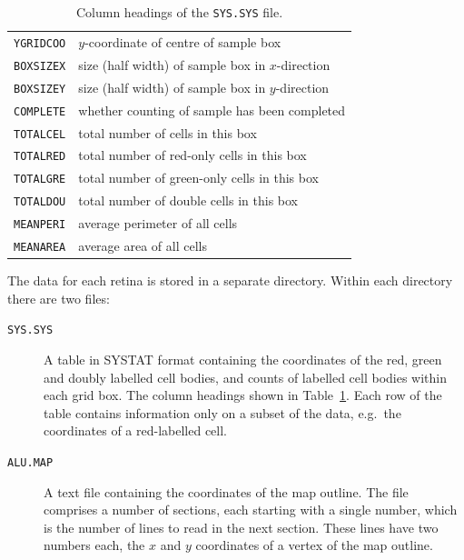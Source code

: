 \documentclass{article}
\begin{document}
\begin{table}
\begin{tabular}{ll}
    \texttt{YGRIDCOO} & $y$-coordinate of centre of sample box \\
    \texttt{BOXSIZEX} & size (half width) of sample box in $x$-direction \\
    \texttt{BOXSIZEY} & size (half width) of sample box in $y$-direction \\
    \texttt{COMPLETE} & whether counting of sample has been completed\\
    \texttt{TOTALCEL} & total number of cells in this box\\
    \texttt{TOTALRED} & total number of red-only cells in this box\\
    \texttt{TOTALGRE} & total number of green-only cells in this box\\
    \texttt{TOTALDOU} & total number of double cells in this box\\
    \texttt{MEANPERI} & average perimeter of all cells \\
    \texttt{MEANAREA} & average area of all cells \\
  \end{tabular}
  \caption{Column headings of the \texttt{SYS.SYS} file.}
  \label{tab:data-format}
\end{table}

The data for each retina is stored in a separate directory. Within
each directory there are two files:
\begin{description}
\item[\texttt{SYS.SYS}] A table in SYSTAT format containing the
  coordinates of the red, green and doubly labelled cell bodies, and
  counts of labelled cell bodies within each grid box. The column
  headings shown in Table~\ref{tab:data-format}.  Each row of the
  table contains information only on a subset of the data, e.g.\ the
  coordinates of a red-labelled cell.
\item[\texttt{ALU.MAP}] A text file containing the coordinates of the
  map outline. The file comprises a number of sections, each starting
  with a single number, which is the number of lines to read in the
  next section. These lines have two numbers each, the $x$ and $y$
  coordinates of a vertex of the map outline.
\end{description}

\end{document}
